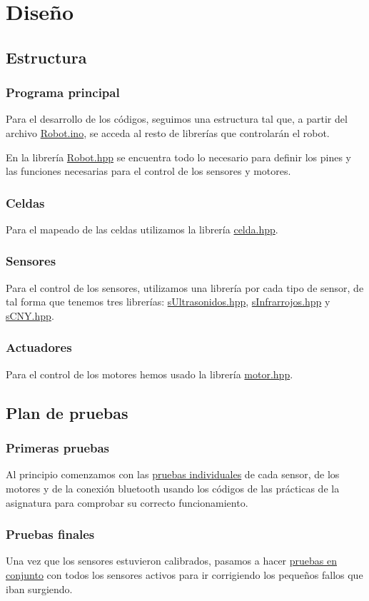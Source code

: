 \chapter{Diseño}
\section{Estructura}
\subsection{Programa principal}
Para el desarrollo de los códigos, seguimos una estructura tal que, a partir del archivo \hyperlink{laberinto}{Robot.ino}, se acceda al resto de librerías que controlarán el robot.

En la librería \hyperlink{Robot}{Robot.hpp} se encuentra todo lo necesario para definir los pines y las funciones necesarias para el control de los sensores y motores.

\subsection{Celdas}
Para el mapeado de las celdas utilizamos la librería \hyperlink{Celda}{celda.hpp}.

\subsection{Sensores}
Para el control de los sensores, utilizamos una librería por cada tipo de sensor, de tal forma que tenemos tres librerías: \hyperlink{sUltrasonidos}{sUltrasonidos.hpp}, \hyperlink{sInfrarrojos}{sInfrarrojos.hpp} y \hyperlink{sCNY}{sCNY.hpp}.

\subsection{Actuadores}
Para el control de los motores hemos usado la librería \hyperlink{Motor}{motor.hpp}.

\section{Plan de pruebas}
\subsection{Primeras pruebas}
Al principio comenzamos con las \hyperlink{primerasPruebas}{pruebas individuales} de cada sensor, de los motores y de la conexión bluetooth usando los códigos de las prácticas de la asignatura para comprobar su correcto funcionamiento.

\subsection{Pruebas finales}
Una vez que los sensores estuvieron calibrados, pasamos a hacer \hyperlink{pruebasFinales}{pruebas en conjunto} con todos los sensores activos para ir corrigiendo los pequeños fallos que iban surgiendo.